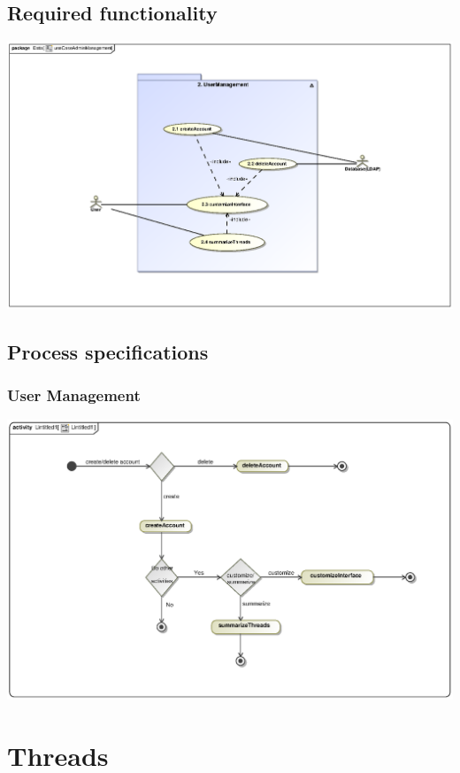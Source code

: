 \documentclass[hidelinks, 12pt, oneside]{article}
\begin{document}
\subsection{Required functionality} 
\includegraphics[scale=.9]{Shaun/graphics/useCaseAdminManagement.eps}\\

\subsection{Process specifications}
\subsubsection{User Management}
\includegraphics[scale=.9]{Sbo/activityDiagramAdminManagement.eps}\\


\section{Threads}
\end{document}
